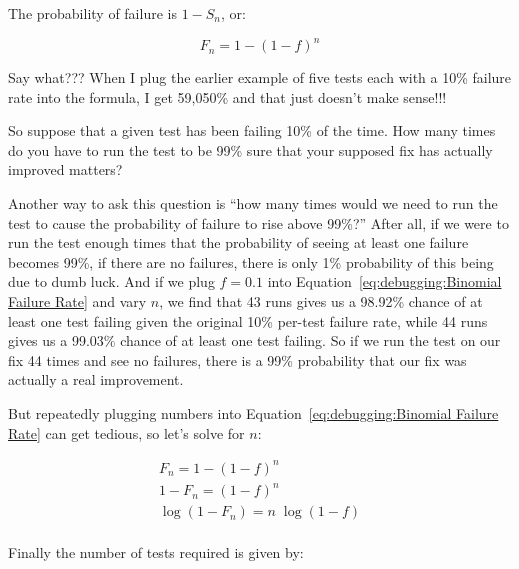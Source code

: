 The probability of failure is $1-S_n$, or:

\begin{equation}
	F_n = 1-\left(1-f\right)^n
\label{eq:debugging:Binomial Failure Rate}
\end{equation}

\QuickQuiz{}
	Say what???
	When I plug the earlier example of five tests each with a
	10\% failure rate into the formula, I get 59,050\% and that
	just doesn't make sense!!!
 \QuickQuizEnd

So suppose that a given test has been failing 10\% of the time.
How many times do you have to run the test to be 99\% sure that
your supposed fix has actually improved matters?

Another way to ask this question is ``how many times would we need
to run the test to cause the probability of failure to rise above 99\%?''
After all, if we were to run the test enough times that the probability
of seeing at least one failure becomes 99\%, if there are no failures,
there is only 1\% probability of this being due to dumb luck.
And if we plug $f=0.1$ into 
Equation~\ref{eq:debugging:Binomial Failure Rate} and vary $n$,
we find that 43 runs gives us a 98.92\% chance of at least one test failing
given the original 10\% per-test failure rate,
while 44 runs gives us a 99.03\% chance of at least one test failing.
So if we run the test on our fix 44 times and see no failures, there
is a 99\% probability that our fix was actually a real improvement.

But repeatedly plugging numbers into
Equation~\ref{eq:debugging:Binomial Failure Rate}
can get tedious, so let's solve for $n$:

\begin{eqnarray}
	F_n = 1-\left(1-f\right)^n \\
	1 - F_n = \left(1-f\right)^n \\
	\log \left(1 - F_n\right) = n \; \log \left(1 - f\right) \\
\end{eqnarray}

Finally the number of tests required is given by:

